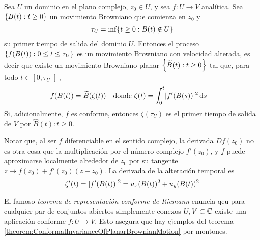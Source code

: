 \begin{theorem}
  \label{theorem:ConformalInvarianceOfPlanarBrownianMotion}
  Sea \(U\) un dominio en el plano complejo, \(z_0 \in U\), y sea \(f : U \rightarrow V\) analítica.
  Sea \(\{B(t) : t \geq 0\}\) un movimiento Browniano que comienza en \(z_0\) y
  \begin{align}
    \tau_U
    =
    \inf \{ t \geq 0 : B(t) \notin U\}
  \end{align}
  su primer tiempo de salida del dominio \(U\).
  Entonces el proceso
  \(\{f(B(t)) : 0 \leq t \leq \tau_U\}\)  %
  es un movimiento Browniano con velocidad alterada, es decir que existe un movimiento Browniano planar \(\left\{ \widetilde{B}(t) : t \geq 0 \right\}\) tal que, para todo \(t \in \left[ 0, \tau_U \right[\),
  \begin{align}
    & f(B(t)) = \widetilde{B}(\zeta(t))
    &
    & \text{donde }
    \zeta(t) = \int_0^t \lvert f'(B(s))\rvert^2 \mathop{}\!\mathrm{d} s
  \end{align}
  Si, adicionalmente, \(f\) es conforme, entonces \(\zeta(\tau_U)\) es el primer tiempo de salida de \(V\) por \(\widehat{B}(t) : t \geq 0\).
\end{theorem}
\begin{remark}
  Notar que, al ser \(f\) diferenciable en el sentido complejo, la derivada \(Df(z_0)\) no es otra cosa que la multiplicación por el número complejo \(f'(z_0)\), y \(f\) puede aproximarse localmente alrededor de \(z_0\) por su tangente \(z \mapsto f(z_0) + f'(z_0)(z - z_0)\).
  La derivada de la alteración temporal es
  \begin{align}
    \zeta'(t)
    =
    \lvert f'(B(t))\rvert^2
    =
    u_x(B(t))^2 + u_y(B(t))^2
  \end{align}
\end{remark}
\begin{remark}
  El famoso \emph{teorema de representación conforme de Riemann} enuncia qeu para cualquier par de conjuntos abiertos simplemente conexos \(U, V \subset \mathbb{C}\) existe una aplicación conforme \(f : U \rightarrow V\).
  Esto asegura que hay ejemplos del teorema \ref{theorem:ConformalInvarianceOfPlanarBrownianMotion} por montones.
\end{remark}
